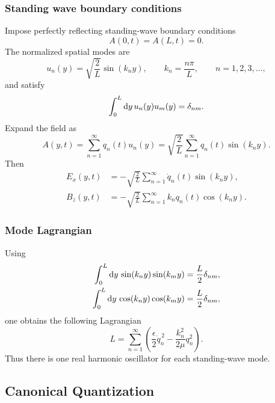 \subsubsection{Standing wave boundary conditions}
Impose perfectly reflecting standing-wave boundary conditions
\begin{equation}
 \boxed{A(0,t)=A(L,t)=0.}
\end{equation}
The normalized spatial modes are
\begin{equation}
 u_n(y)=\sqrt{\frac{2}{L}}\sin(k_ny),
 \qquad
 k_n=\frac{n\pi}{L},
 \qquad
 n=1,2,3,\ldots,
\end{equation}
and satisfy
\begin{equation}
 \int_0^L\mathrm{d} y\,u_n(y)u_m(y)=\delta_{nm}.
\end{equation}
Expand the field as
\begin{equation}
 \boxed{A(y,t)=\sum_{n=1}^{\infty}q_n(t)u_n(y)
 =\sqrt{\frac{2}{L}}\sum_{n=1}^{\infty}
 q_n(t)\sin(k_ny).}
\end{equation}
Then
\begin{align}
 E_x(y,t)&=-\sqrt{\frac{2}{L}}
 \sum_{n=1}^{\infty}\dot q_n(t)\sin(k_ny),\\
 B_z(y,t)&=-\sqrt{\frac{2}{L}}
 \sum_{n=1}^{\infty}k_nq_n(t)\cos(k_ny).
\end{align}

\subsubsection{Mode Lagrangian}
Using
\begin{align}
 \int_0^L\mathrm{d} y\,\sin(k_ny)\sin(k_my)&=\frac{L}{2}\delta_{nm},\\
 \int_0^L\mathrm{d} y\,\cos(k_ny)\cos(k_my)&=\frac{L}{2}\delta_{nm},
\end{align}
one obtains the following Lagrangian
\begin{equation}
 \boxed{L=\sum_{n=1}^{\infty}
 \left(\frac{\epsilon}{2}\dot q_n^{\,2}
 -\frac{k_n^2}{2\mu}q_n^2\right).}
\end{equation}
Thus there is one real harmonic oscillator for each standing-wave mode.

\subsection{Canonical Quantization}

